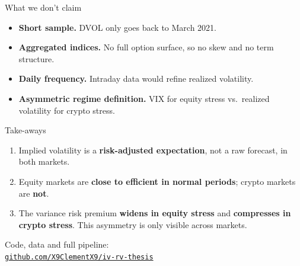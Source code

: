 \documentclass[aspectratio=169,11pt]{beamer}
\begin{document}
\begin{frame}{What we don't claim}
  \vspace*{3mm}
  \begin{itemize}
    \setlength\itemsep{3.5mm}
    \item \textbf{Short sample.} DVOL only goes back to March 2021.
    \item \textbf{Aggregated indices.} No full option surface, so no skew and no term structure.
    \item \textbf{Daily frequency.} Intraday data would refine realized volatility.
    \item \textbf{Asymmetric regime definition.} VIX for equity stress vs.\ realized volatility for crypto stress.
  \end{itemize}
\end{frame}

\begin{frame}{Take-aways}
  \vspace*{3mm}
  \begin{enumerate}
    \setlength\itemsep{4mm}
    \item Implied volatility is a \textbf{risk-adjusted expectation}, not a raw forecast, in both markets.
    \item Equity markets are \textbf{close to efficient in normal periods}; crypto markets are \textbf{not}.
    \item The variance risk premium \textbf{widens in equity stress} and \textbf{compresses in crypto stress}. This asymmetry is only visible across markets.
  \end{enumerate}
  \vspace*{8mm}
  \begin{center}
    \small Code, data and full pipeline:\\
    \href{https://github.com/X9ClementX9/iv-rv-thesis}{\texttt{github.com/X9ClementX9/iv-rv-thesis}}
  \end{center}
\end{frame}
\end{document}
